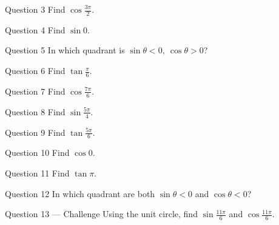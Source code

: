 \documentclass[11pt]{article}
\begin{document}
\begin{qbox}{Question 3}
Find $\cos\tfrac{3\pi}{2}$.\workspace{2.4cm}
\end{qbox}

\begin{qbox}{Question 4}
Find $\sin 0$.\workspace{2.4cm}
\end{qbox}

\begin{qbox}{Question 5}
In which quadrant is $\sin\theta<0,\ \cos\theta>0$?\workspace{2.4cm}
\end{qbox}

\begin{qbox}{Question 6}
Find $\tan\tfrac{\pi}{6}$.\workspace{2.4cm}
\end{qbox}

\begin{qbox}{Question 7}
Find $\cos\tfrac{7\pi}{6}$.\workspace{2.4cm}
\end{qbox}

\begin{qbox}{Question 8}
Find $\sin\tfrac{5\pi}{4}$.\workspace{2.4cm}
\end{qbox}

\begin{qbox}{Question 9}
Find $\tan\tfrac{5\pi}{6}$.\workspace{2.4cm}
\end{qbox}

\begin{qbox}{Question 10}
Find $\cos 0$.\workspace{2.4cm}
\end{qbox}

\begin{qbox}{Question 11}
Find $\tan\pi$.\workspace{2.4cm}
\end{qbox}

\begin{qbox}{Question 12}
In which quadrant are both $\sin\theta<0$ and $\cos\theta<0$?\workspace{2.4cm}
\end{qbox}

\begin{qbox}{Question 13 --- Challenge}
Using the unit circle, find $\sin\tfrac{11\pi}{6}$ and $\cos\tfrac{11\pi}{6}$.\workspace{3cm}
\end{qbox}

\clearpage
{}
\end{document}
